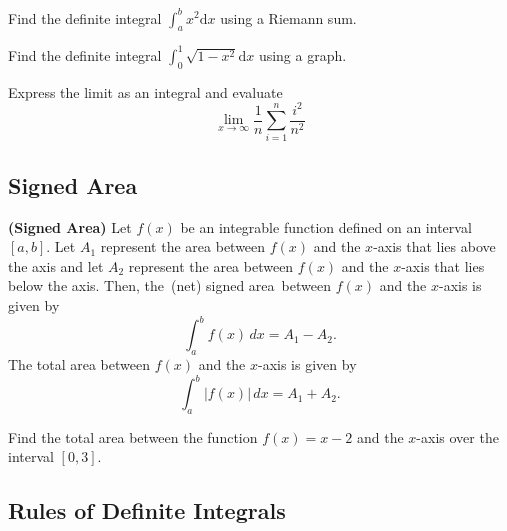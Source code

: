 \begin{example}

Find the definite integral \(\int_{a}^bx^2\mathrm{d}x\) using a Riemann
sum.

\end{example}
\vspace*{6\baselineskip}

\begin{example}

Find the definite integral \(\int_0^1\sqrt{1-x^2}\mathrm{d}x\) using a
graph.

\end{example}
\vspace*{6\baselineskip}

\begin{example}

Express the limit as an integral and evaluate
\[\lim\limits_{x\to \infty}\frac{1}{n}\sum_{i=1}^n\frac{i^2}{n^2}\]

\end{example}
\vspace*{6\baselineskip}

\hypertarget{signed-area}{%
\subsection{Signed Area}\label{signed-area}}

\begin{definition}

\textbf{(Signed Area)} Let \(f(x)\) be an integrable function defined on
an interval \([a,b]\). Let \(A_1\) represent the area between \(f(x)\)
and the \(x\)-axis that lies above the axis and let \(A_2\) represent
the area between \(f(x)\) and the \(x\)-axis that lies below the axis.
Then, the~(net) signed area~between \(f(x)\) and the \(x\)-axis is given
by \[\int^b_af(x)\,dx=A_1 - A_2.\] The total area between \(f(x)\) and the
\(x\)-axis is given by \[\int^b_a|f(x)|\,dx=A_1+A_2.\]

\end{definition}

\begin{example}

Find the total area between the function \(f(x)=x-2\) and the \(x\)-axis
over the interval \([0,3]\).

\end{example}
\vspace*{6\baselineskip}

\hypertarget{rules-of-definite-integrals}{%
\subsection{Rules of Definite
Integrals}\label{rules-of-definite-integrals}}

